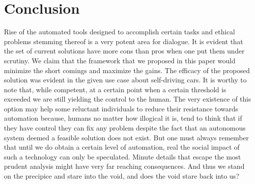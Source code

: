 \section{Conclusion}
\label{sec:-conc}
Rise of the automated tools designed to accomplish certain tasks and ethical problems stemming thereof is a very potent area for dialogue. It is evident that the set of current solutions have more cons than pros when one put them under scrutiny. We claim that the framework that we proposed in this paper would minimize the short comings and maximize the gains. The efficacy of the proposed solution was evident in the given use case about self-driving cars. It is worthy to note that, while competent, at a certain point when a certain threshold is exceeded we are still yielding the control to the human. The very existence of this option may help some reluctant individuals to reduce their resistance towards automation because, humans no matter how illogical it is, tend to think that if they have control they can fix any problem despite the fact that an autonomous system deemed a feasible solution does not exist. But one must always remember that until we do obtain a certain level of automation, real the social impact of such a technology can only be speculated. Minute details that escape the most prudent analysis might have very far reaching consequences. And thus we stand on the precipice and stare into the void, and does the void stare back into us?

